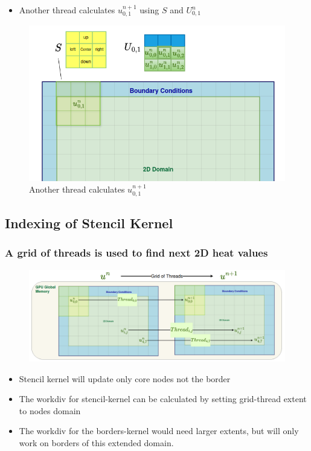 \documentclass[9pt]{beamer}
\begin{document}
\begin{frame}
\vspace{-0.9\baselineskip}
    \begin{itemize}
        \item Another thread calculates $u_{0,1}^{n+1}$  using $S$ and $U^{n}_{0,1}$
    \end{itemize}
    \begin{figure}
        \centering
        \includegraphics[width=0.8\linewidth,height=0.45\linewidth]{Screenshot from 2024-09-21 23-44-50.png}
        \caption{Another thread calculates $u_{0,1}^{n+1}$ }
        \label{fig:enter-label}
    \end{figure}
\end{frame}

\subsection{Indexing of Stencil Kernel}
\begin{frame}
\frametitle{A grid of threads is used to find next 2D heat values}
\begin{figure}
    \centering
    \includegraphics[width=0.86\linewidth]{Screenshot from 2024-10-02 16-04-45.png}
\end{figure}

\begin{itemize}
    \item Stencil kernel will update only core nodes not the border
    \item The workdiv for stencil-kernel can be calculated by setting grid-thread extent to nodes domain
    \item The workdiv for the borders-kernel would need larger extents, but will only work on borders of this extended domain.    %
\end{itemize}


\end{frame}
\end{document}
